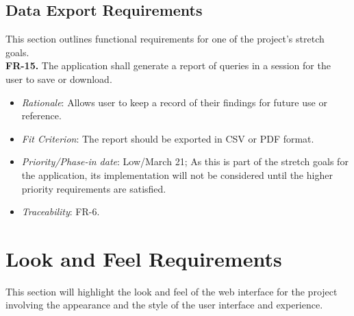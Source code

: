 \documentclass[12pt]{article}
\begin{document}
\subsection{Data Export Requirements}
This section outlines functional requirements for one of the project's stretch
goals.\\
\newline
\textbf{FR-15.} The application shall generate a report of queries in a session for the user to save or download.
  \begin{itemize}
    \item \textit{Rationale}: Allows user to keep a record of their findings for future use or reference.
    \item \textit{Fit Criterion}: The report should be exported in CSV or PDF format.
    \item \textit{Priority/Phase-in date}: Low/March 21; As this is part of the stretch goals for the application, its implementation will not be considered until the higher priority requirements are satisfied.
    \item \textit{Traceability}: FR-6.
  \end{itemize}

\section{Look and Feel Requirements}
This section will highlight the look and feel of the web interface for the
project involving the appearance and the style of the user interface and
experience.
\end{document}
